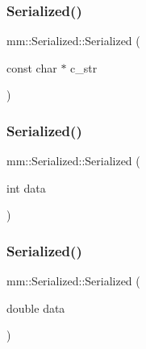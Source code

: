 \subsubsection{\texorpdfstring{Serialized()}{Serialized()}\hspace{0.1cm}{\footnotesize\ttfamily [2/7]}}
{\footnotesize\ttfamily mm\+::\+Serialized\+::\+Serialized (\begin{DoxyParamCaption}\item[{const char $\ast$}]{c\+\_\+str }\end{DoxyParamCaption})\hspace{0.3cm}{\ttfamily [noexcept]}}

\mbox{\label{structmm_1_1_serialized_a2d29dc6d2cb8eed1a768a378b1d61b8f}} 
\subsubsection{\texorpdfstring{Serialized()}{Serialized()}\hspace{0.1cm}{\footnotesize\ttfamily [3/7]}}
{\footnotesize\ttfamily mm\+::\+Serialized\+::\+Serialized (\begin{DoxyParamCaption}\item[{int}]{data }\end{DoxyParamCaption})\hspace{0.3cm}{\ttfamily [noexcept]}}

\mbox{\label{structmm_1_1_serialized_ae11ee0c67ffaed5dfc69bf52f33ebcca}} 
\subsubsection{\texorpdfstring{Serialized()}{Serialized()}\hspace{0.1cm}{\footnotesize\ttfamily [4/7]}}
{\footnotesize\ttfamily mm\+::\+Serialized\+::\+Serialized (\begin{DoxyParamCaption}\item[{double}]{data }\end{DoxyParamCaption})\hspace{0.3cm}{\ttfamily [noexcept]}}

